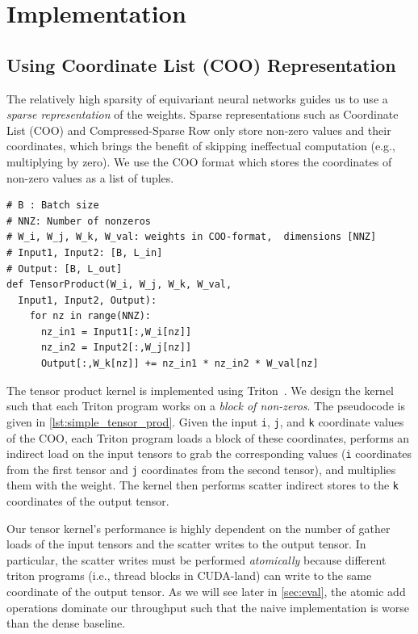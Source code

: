 \section{Implementation}
\label{sec:impl}

\subsection{Using Coordinate List (COO) Representation}
\label{sec:impl:coo}

The relatively high sparsity of equivariant neural networks guides us to use a \textit{sparse representation} of the weights. Sparse representations such as Coordinate List (COO) and Compressed-Sparse Row only store non-zero values and their coordinates,
which brings the benefit of skipping ineffectual computation (e.g., multiplying by zero). We use the COO format which stores the coordinates of non-zero values as a list of tuples.

\begin{lstlisting}[caption={Hash table lookup code.}, label={lst:simple_tensor_prod}, style=custompython]
# B : Batch size
# NNZ: Number of nonzeros
# W_i, W_j, W_k, W_val: weights in COO-format,  dimensions [NNZ]
# Input1, Input2: [B, L_in]
# Output: [B, L_out]
def TensorProduct(W_i, W_j, W_k, W_val, 
  Input1, Input2, Output):
    for nz in range(NNZ):
      nz_in1 = Input1[:,W_i[nz]]
      nz_in2 = Input2[:,W_j[nz]]
      Output[:,W_k[nz]] += nz_in1 * nz_in2 * W_val[nz]
\end{lstlisting}

The tensor product kernel is implemented using Triton~\cite{tillet2019triton}.
We design the kernel such that each Triton program works on a \textit{block of non-zeros}.
The pseudocode is given in \autoref{lst:simple_tensor_prod}.
Given the input \texttt{i}, \texttt{j}, and \texttt{k} coordinate values of the COO,
each Triton program loads a block of these coordinates,
performs an indirect load on the input tensors to grab the corresponding values
(\texttt{i} coordinates from the first tensor and \texttt{j} coordinates from the second tensor),
and multiplies them with the weight.
The kernel then performs scatter indirect stores to the \texttt{k} coordinates
of the output tensor.

Our tensor kernel's performance is highly dependent on the number of gather loads of the input tensors
and the scatter writes to the output tensor.
In particular, the scatter writes must be performed \textit{atomically} because different triton programs (i.e., thread blocks in CUDA-land) can write to the same coordinate of the output tensor.
As we will see later in \autoref{sec:eval}, the atomic add operations dominate our throughput such that the naive implementation is worse than the dense baseline.

